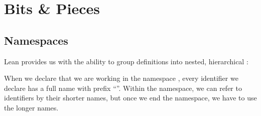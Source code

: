\documentclass[letterpaper,10pt,english]{sphinxmanual}
\begin{document}
\begin{sphinxVerbatim}[commandchars=\\\{\}]
  
       
       
    
\end{sphinxVerbatim}

\sphinxstepscope


\chapter{Bits \& Pieces}
\label{\detokenize{day5:bits-pieces}}\label{\detokenize{day5:day5}}\label{\detokenize{day5::doc}}

\section{Namespaces}
\label{\detokenize{day5:namespaces}}
\sphinxAtStartPar
Lean provides us with the ability to group definitions into nested, hierarchical :

\begin{sphinxVerbatim}[commandchars=\\\{\}]
 
     
   
 

   
 
 

 

  
 
\end{sphinxVerbatim}

\sphinxAtStartPar
When we declare that we are working in the namespace , every identifier we declare has a full name with prefix “”.
Within the namespace, we can refer to identifiers by their shorter names, but once we end the namespace, we have to use the longer names.
\end{document}
